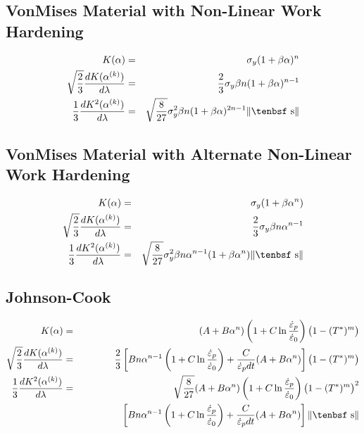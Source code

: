 \documentclass[11pt]{book}
\def\dev{\hbox{\tenbsf s}}
\begin{document}
\subsection{VonMises Material with Non-Linear Work Hardening}

\begin{eqnarray}
   K(\alpha) & = & \sigma_y(1+\beta\alpha)^n \\
   \sqrt{2\over3}{dK(\alpha^{(k)})\over d\lambda} & = & {2\over 3} \sigma_y \beta n (1+\beta\alpha)^{n-1} \\
   {1\over3}{dK^2(\alpha^{(k)})\over d\lambda} & = & \sqrt{8\over27} \sigma_y^2 \beta n  (1+\beta\alpha)^{2n-1} \|\dev\|
\end{eqnarray}

\subsection{VonMises Material with Alternate Non-Linear Work Hardening}

\begin{eqnarray}
   K(\alpha) & = & \sigma_y(1+\beta\alpha^n) \\
   \sqrt{2\over3}{dK(\alpha^{(k)})\over d\lambda} & = & {2\over 3} \sigma_y \beta n\alpha^{n-1} \\
   {1\over3}{dK^2(\alpha^{(k)})\over d\lambda} & = & \sqrt{8\over27}\sigma_y^2\beta n\alpha^{n-1}(1+\beta\alpha^n)\|\dev\|
\end{eqnarray}

\subsection{Johnson-Cook}

\begin{eqnarray}
   K(\alpha) & = &  (A+B\alpha^n)\left(1+C\ln{\dot{\varepsilon}_p\over \dot{\varepsilon}_0}\right)\bigl(1-(T^*)^m\bigr) \\
   \sqrt{2\over3}{dK(\alpha^{(k)})\over d\lambda} & = &  {2\over 3} \left[B n \alpha^{n-1}\left(1+C\ln{\dot{\varepsilon}_p\over \dot{\varepsilon}_0}\right)
                  + {C\over \dot{\varepsilon}_p dt}(A+B\alpha^n)
              \right] \bigl(1-(T^*)^m\bigr)\\
   {1\over3}{dK^2(\alpha^{(k)})\over d\lambda} & = & \sqrt{8\over27}(A+B\alpha^n)\left(1+C\ln{\dot{\varepsilon}_p\over \dot{\varepsilon}_0}\right)
                   \bigl(1-(T^*)^m\bigr)^2  \nonumber \\
    && \qquad\qquad\mbox{}
              \left[B n \alpha^{n-1}\left(1+C\ln{\dot{\varepsilon}_p\over \dot{\varepsilon}_0}\right)
                  + {C\over \dot{\varepsilon}_p dt}(A+B\alpha^n)
              \right]  \|\dev\|
\end{eqnarray}
\end{document}
